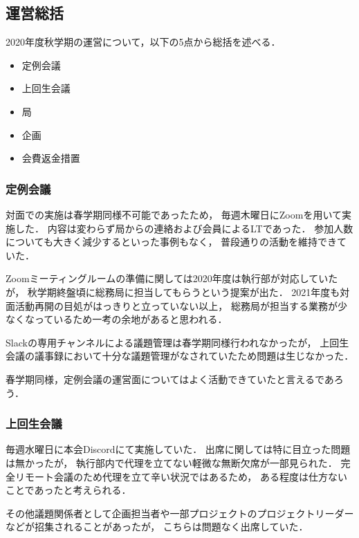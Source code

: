 \subsection*{運営総括}


2020年度秋学期の運営について，以下の5点から総括を述べる．
\begin{itemize}
  \item 定例会議
  \item 上回生会議
  \item 局
  \item 企画
  \item 会費返金措置
\end{itemize}

\subsubsection*{定例会議}
対面での実施は春学期同様不可能であったため，
毎週木曜日にZoomを用いて実施した．
内容は変わらず局からの連絡および会員によるLTであった．
参加人数についても大きく減少するといった事例もなく，
普段通りの活動を維持できていた．

Zoomミーティングルームの準備に関しては2020年度は執行部が対応していたが，
秋学期終盤頃に総務局に担当してもらうという提案が出た．
2021年度も対面活動再開の目処がはっきりと立っていない以上，
総務局が担当する業務が少なくなっているため一考の余地があると思われる．

Slackの専用チャンネルによる議題管理は春学期同様行われなかったが，
上回生会議の議事録において十分な議題管理がなされていたため問題は生じなかった．

春学期同様，定例会議の運営面についてはよく活動できていたと言えるであろう．

\subsubsection*{上回生会議}
毎週水曜日に本会Discordにて実施していた．
出席に関しては特に目立った問題は無かったが，
執行部内で代理を立てない軽微な無断欠席が一部見られた．
完全リモート会議のため代理を立て辛い状況ではあるため，
ある程度は仕方ないことであったと考えられる．

その他議題関係者として企画担当者や一部プロジェクトのプロジェクトリーダーなどが招集されることがあったが，
こちらは問題なく出席していた．

